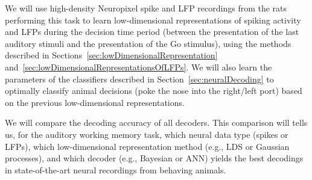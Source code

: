 We will use high-density Neuropixel spike and LFP recordings from the rats
performing this task to learn low-dimensional representations of spiking
activity and LFPs during the decision time period (between the presentation of
the last auditory stimuli and the presentation of the Go stimulus), using the
methods described in
Sections~\ref{sec:lowDimensionalRepresentation}
and~\ref{sec:lowDimensionalRepresentationsOfLFPs}. We will also learn the
parameters of the classifiers described in Section~\ref{sec:neuralDecoding} to
optimally classify animal decisions (poke the nose into the right/left port)
based on the previous low-dimensional representations.

We will compare the decoding accuracy of all decoders. This comparison will
tells us, for the auditory working memory task, which neural data type (spikes
or LFPs), which low-dimensional representation method (e.g., LDS or Gaussian
processes), and which decoder (e.g., Bayesian or ANN) yields the best decodings
in state-of-the-art neural recordings from behaving animals.

